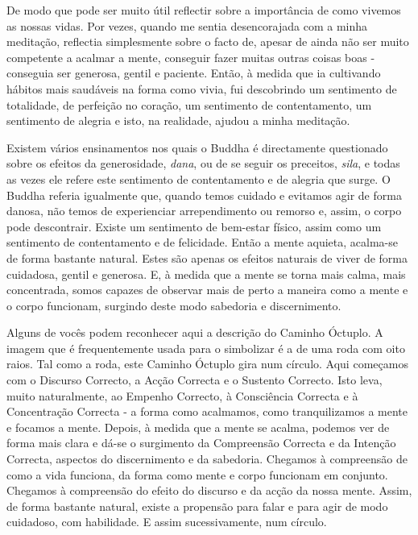 De modo que pode ser muito útil reflectir sobre a importância de como
vivemos as nossas vidas. Por vezes, quando me sentia desencorajada com a
minha meditação, reflectia simplesmente sobre o facto de, apesar de
ainda não ser muito competente a acalmar a mente, conseguir fazer muitas
outras coisas boas - conseguia ser generosa, gentil e paciente. Então, à
medida que ia cultivando hábitos mais saudáveis na forma como vivia, fui
descobrindo um sentimento de totalidade, de perfeição no coração, um
sentimento de contentamento, um sentimento de alegria e isto, na
realidade, ajudou a minha meditação.

Existem vários ensinamentos nos quais o Buddha é directamente
questionado sobre os efeitos da generosidade, \emph{dana}, ou de se
seguir os preceitos, \emph{sila}, e todas as vezes ele refere este
sentimento de contentamento e de alegria que surge. O Buddha referia
igualmente que, quando temos cuidado e evitamos agir de forma danosa,
não temos de experienciar arrependimento ou remorso e, assim, o corpo
pode descontrair. Existe um sentimento de \mbox{bem-estar} físico, assim como
um sentimento de contentamento e de felicidade. Então a mente aquieta,
acalma-se de forma bastante natural. Estes são apenas os efeitos
naturais de viver de forma cuidadosa, gentil e generosa. E, à medida que
a mente se torna mais calma, mais concentrada, somos capazes de observar
mais de perto a maneira como a mente e o corpo funcionam, surgindo deste
modo sabedoria e discernimento.

Alguns de vocês podem reconhecer aqui a descrição do Caminho Óctuplo. A
imagem que é frequentemente usada para o simbolizar é a de uma roda com
oito raios. Tal como a roda, este Caminho Óctuplo gira num círculo. Aqui
começamos com o Discurso Correcto, a Acção Correcta e o Sustento
Correcto. Isto leva, muito naturalmente, ao Empenho Correcto, à
Consciência Correcta e à Concentração Correcta - a forma como acalmamos,
como tranquilizamos a mente e focamos a mente. Depois, à medida que a
mente se acalma, podemos ver de forma mais clara e dá-se o surgimento da
Compreensão Correcta e da Intenção Correcta, aspectos do discernimento e
da sabedoria. Chegamos à compreensão de como a vida funciona, da forma
como mente e corpo funcionam em conjunto. Chegamos à compreensão do
efeito do discurso e da acção da nossa mente. Assim, de forma bastante
natural, existe a propensão para falar e para agir de modo cuidadoso,
com habilidade. E assim sucessivamente, num círculo.

